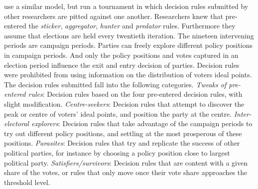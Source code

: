 \documentclass[preprint, 12pt]{elsarticle}
\begin{document}
\citet{Fowler_Laver_2008} use a similar model, but run a tournament in which decision rules submitted by other researchers are pitted against one another. Researchers knew that \citet{Fowler_Laver_2008} pre-entered the \emph{sticker}, \emph{aggregator}, \emph{hunter} and \emph{predator} rules. Furthermore they assume that elections are held every twentieth iteration. The nineteen intervening periods are campaign periods. Parties can freely explore different policy positions in campaign periods. And only the policy positions and votes captured in an election period influence the exit and entry decision of parties. Decision rules were prohibited from using information on the distribution of voters ideal points. The decision rules submitted fall into the following categories. \emph{Tweaks of pre-entered rules}: Decision rules based on the four pre-entered decision rules, with slight modification. \emph{Centre-seekers}: Decision rules that attempt to discover the peak or centre of voters' ideal points, and position the party at the centre. \emph{Inter-electoral explorers}: Decision rules that take advantage of the campaign periods to try out different policy positions, and settling at the most prosperous of these positions. \emph{Parasites}: Decision rules that try and replicate the success of other political parties, for instance by choosing a policy position close to largest political party. \emph{Satisfiers/survivors}: Decision rules that are content with a given share of the votes, or rules that only move once their vote share approaches the threshold level.
\end{document}
